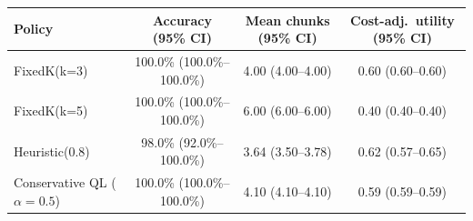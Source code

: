 \begin{tabular}{lccc}
  \toprule
  Policy & Accuracy (95\% CI) & Mean chunks (95\% CI) & Cost-adj.\ utility (95\% CI) \\
  \midrule
  FixedK(k=3) & 100.0\% (100.0\%--100.0\%) & 4.00 (4.00--4.00) & 0.60 (0.60--0.60) \\
  FixedK(k=5) & 100.0\% (100.0\%--100.0\%) & 6.00 (6.00--6.00) & 0.40 (0.40--0.40) \\
  Heuristic(0.8) & 98.0\% (92.0\%--100.0\%) & 3.64 (3.50--3.78) & 0.62 (0.57--0.65) \\
  Conservative QL ($\alpha=0.5$) & 100.0\% (100.0\%--100.0\%) & 4.10 (4.10--4.10) & 0.59 (0.59--0.59) \\
  \bottomrule
\end{tabular}